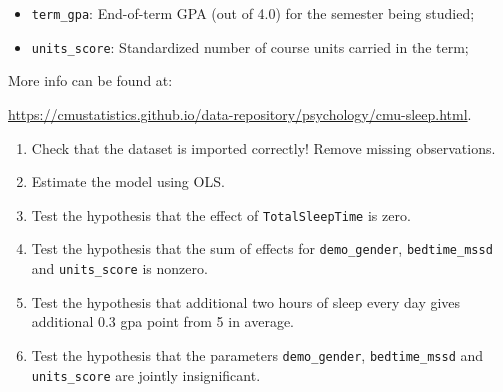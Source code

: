 \documentclass[12pt]{article}
\begin{document}
\begin{enumerate}
\begin{itemize}
    \item \verb|term_gpa|: End-of-term GPA (out of 4.0) for the semester being studied;
    
    \item \verb|units_score|: Standardized number of course units carried in the term;
    \end{itemize}
    
    More info can be found at: 
    
    \url{https://cmustatistics.github.io/data-repository/psychology/cmu-sleep.html}.
    
    \begin{enumerate}
        \item Check that the dataset is imported correctly! Remove missing observations. 
        \item Estimate the model using OLS.
        \item Test the hypothesis that the effect of \verb|TotalSleepTime| is zero.
        \item Test the hypothesis that the sum of effects for \verb|demo_gender|, \verb|bedtime_mssd| and \verb|units_score| is nonzero.
        \item Test the hypothesis that additional two hours of sleep every day gives additional 0.3 gpa point from 5 in average.
        \item Test the hypothesis that the parameters \verb|demo_gender|, \verb|bedtime_mssd| and \verb|units_score| are jointly insignificant.
    \end{enumerate}
    

\end{enumerate}
\end{document}
